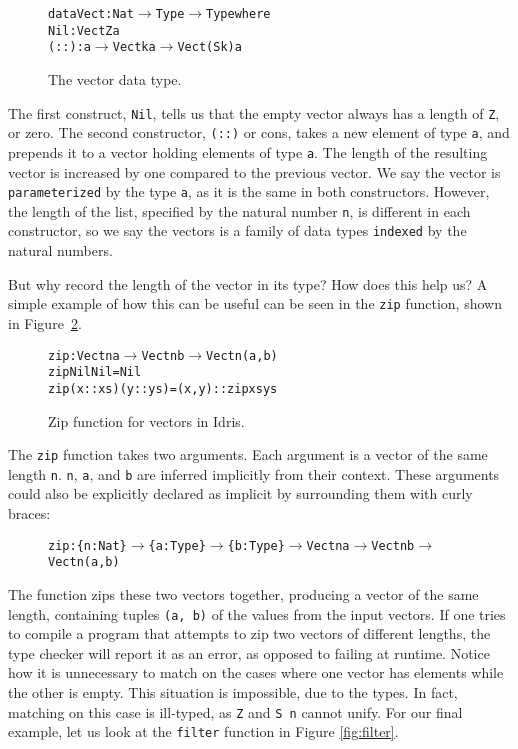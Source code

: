 \begin{figure}
\begin{alltt}
data Vect : Nat \(\to\) Type \(\to\) Type where
  Nil  : Vect Z a
  (::) : a \(\to\) Vect k a \(\to\) Vect (S k) a
\end{alltt}
\caption{The vector data type.}
\label{fig:vect}
\end{figure}

The first construct, \texttt{Nil}, tells us that the empty vector always has a length of \texttt{Z}, or zero. The second constructor, \texttt{(::)} or cons, takes a new element of type \texttt{a}, and prepends it to a vector holding elements of type \texttt{a}. The length of the resulting vector is increased by one compared to the previous vector. We say the vector is \texttt{parameterized} by the type \texttt{a}, as it is the same in both constructors. However, the length of the list, specified by the natural number \texttt{n}, is different in each constructor, so we say the vectors is a family of data types \texttt{indexed} by the natural numbers.

But why record the length of the vector in its type? How does this help us? A simple example of how this can be useful can be seen in the \texttt{zip} function, shown in Figure~\ref{fig:zip}.

\begin{figure}
\begin{alltt}
zip : Vect n a \(\to\) Vect n b \(\to\) Vect n (a, b)
zip Nil       Nil       = Nil
zip (x :: xs) (y :: ys) = (x, y) :: zip xs ys
\end{alltt}
\caption{Zip function for vectors in Idris.}
\label{fig:zip}
\end{figure}

The \texttt{zip} function takes two arguments. Each argument is a vector of the same length \texttt{n}. \texttt{n}, \texttt{a}, and \texttt{b} are inferred implicitly from their context. These arguments could also be explicitly declared as implicit by surrounding them with curly braces: 

\begin{figure}
\begin{alltt}
zip : \{n: Nat\} \(\to\) \{a: Type\} \(\to\) \{b: Type\} \(\to\) Vect n a \(\to\) Vect n b \(\to\) Vect n (a, b)
\end{alltt}
\end{figure}

The function zips these two vectors together, producing a vector of the same length, containing tuples \texttt{(a, b)} of the values from the input vectors. If one tries to compile a program that attempts to zip two vectors of different lengths, the type checker will report it as an error, as opposed to failing at runtime. Notice how it is unnecessary to match on the cases where one vector has elements while the other is empty. This situation is impossible, due to the types. In fact, matching on this case is ill-typed, as \texttt{Z} and \texttt{S~n} cannot unify. For our final example, let us look at the \texttt{filter} function in Figure \ref{fig:filter}.

